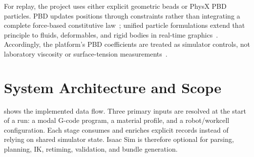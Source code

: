 \documentclass[letterpaper,10pt,conference]{ieeeconf}
\begin{document}
For replay, the project uses either explicit geometric beads or PhysX PBD
particles.  PBD updates positions through constraints rather than integrating a
complete force-based constitutive law~\cite{muller2007pbd}; unified particle
formulations extend that principle to fluids, deformables, and rigid bodies in
real-time graphics~\cite{macklin2014unified}.  Accordingly, the platform's PBD
coefficients are treated as simulator controls, not laboratory viscosity or
surface-tension measurements~\cite{nvidia2025particles}.

\section{System Architecture and Scope}

 shows the implemented data flow.  Three primary inputs
are resolved at the start of a run: a modal G-code program, a material profile,
and a robot/workcell configuration.  Each stage consumes and enriches explicit
records instead of relying on shared simulator state.  Isaac Sim is therefore
optional for parsing, planning, IK, retiming, validation, and bundle generation.
\end{document}
